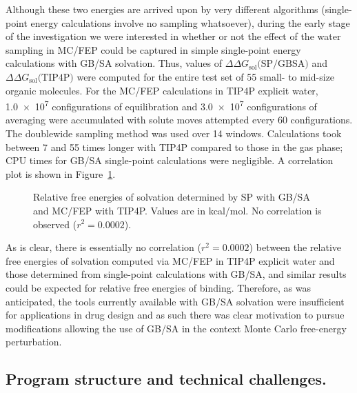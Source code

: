 \documentclass[12pt]{report}
\def\figlab{Figure}\def\figslab{\figlab s}
\newcommand*\fig[1]{\figlab~\ref{#1}}
\begin{document}
Although these two energies are arrived upon by very different algorithms (single-point energy calculations involve no sampling whatsoever), during the early stage of the investigation we were interested in whether or not the effect of the water sampling in MC/FEP could be captured in simple single-point energy calculations with GB/SA solvation. Thus, values of $\Delta\Delta G_{\textrm{sol}}\textrm{(SP/GBSA)}$ and $\Delta\Delta G_{\textrm{sol}}\textrm{(TIP4P)}$ were computed for the entire test set of 55 small- to mid-size organic molecules. For the MC/FEP calculations in TIP4P explicit water, \num{1.0e7} configurations of equilibration and \num{3.0e7} configurations of averaging were accumulated with solute moves attempted every 60 configurations. The doublewide sampling method was used over 14 windows. Calculations took between 7 and 55 times longer with TIP4P compared to those in the gas phase; CPU times for GB/SA single-point calculations were negligible. A correlation plot is shown in \fig{precorr}. 

\begin{figure}[b!]
\centering

\caption{Relative free energies of solvation determined by SP with GB/SA and MC/FEP with TIP4P. Values are in kcal/mol. No correlation is observed ($r^{2} = 0.0002$).}
\label{precorr}
\end{figure}

As is clear, there is essentially no correlation ($r^{2} = 0.0002$) between the relative free energies of solvation computed via MC/FEP in TIP4P explicit water and those determined from single-point calculations with GB/SA, and similar results could be expected for relative free energies of binding. Therefore, as was anticipated, the tools currently available with GB/SA solvation were insufficient for applications in drug design and as such there was clear motivation to pursue modifications allowing the use of GB/SA in the context Monte Carlo free-energy perturbation.


\subsection{Program structure and technical challenges.}
\end{document}
